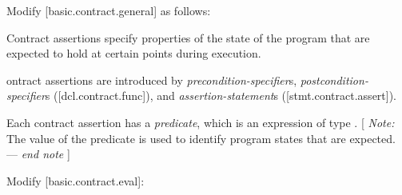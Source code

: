 Modify [basic.contract.general] as follows:
\begin{adjustwidth}{0.5cm}{0.5cm}
Contract assertions specify properties of the state of the program that are expected to hold at certain points during execution.

ontract assertions are introduced by \emph{precondition-specifier}s, \emph{postcondition-specifier}s ([dcl.contract.func]), and \emph{assertion-statement}s ([stmt.contract.assert]). 

Each contract assertion has a \emph{predicate}, which is an expression of type . [ \emph{Note:} The value of the predicate is used to identify program states that are expected. --- \emph{end note} ]
\end{adjustwidth}

Modify [basic.contract.eval]:

